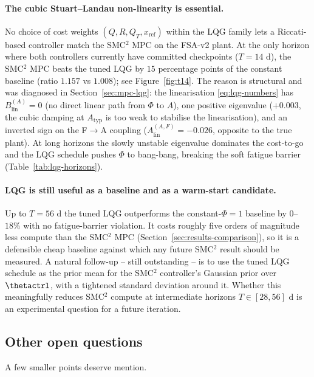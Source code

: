 \paragraph{The cubic Stuart--Landau non-linearity is essential.} No
choice of cost weights $(Q,R,Q_T,x_{\mathrm{ref}})$ within the LQG
family lets a Riccati-based controller match the SMC${}^2$ MPC on
the FSA-v2 plant. At the only horizon where both controllers
currently have committed checkpoints ($T = 14$ d), the SMC${}^2$ MPC
beats the tuned LQG by $15$ percentage points of the constant
baseline (ratio $1.157$ vs $1.008$); see
Figure~\ref{fig:t14}. The reason is structural and was diagnosed
in Section~\ref{sec:mpc-lqg}: the linearisation
\eqref{eq:lqg-numbers} has $B_{\mathrm{lin}}^{(A)} = 0$ (no direct
linear path from $\Phi$ to $A$), one positive eigenvalue ($+0.003$,
the cubic damping at $A_{\mathrm{typ}}$ is too weak to stabilise the
linearisation), and an inverted sign on the F$\to$A coupling
($A_{\mathrm{lin}}^{(A,F)} = -0.026$, opposite to the true plant).
At long horizons the slowly unstable eigenvalue dominates the
cost-to-go and the LQG schedule pushes $\Phi$ to bang-bang, breaking
the soft fatigue barrier (Table~\ref{tab:lqg-horizons}).

\paragraph{LQG is still useful as a baseline and as a warm-start
candidate.} Up to $T = 56$ d the tuned LQG outperforms the
constant-$\Phi=1$ baseline by $0$--$18\%$ with no fatigue-barrier
violation. It costs roughly five orders of magnitude less compute
than the SMC${}^2$ MPC (Section~\ref{sec:results-comparison}), so
it is a defensible cheap baseline against which any future SMC${}^2$
result should be measured. A natural follow-up -- still outstanding --
is to use the tuned LQG schedule as the prior mean for the
SMC${}^2$ controller's Gaussian prior over $\thetactrl$, with a
tightened standard deviation around it. Whether this meaningfully
reduces SMC${}^2$ compute at intermediate horizons
$T \in [28,56]$ d is an experimental question for a future
iteration.

\subsection{Other open questions}\label{sec:discussion-other}

A few smaller points deserve mention.

